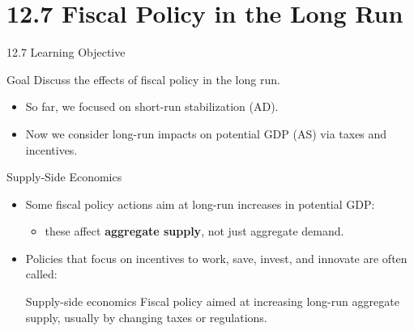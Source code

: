 \documentclass[aspectratio=169]{beamer}
\begin{document}
\section{12.7 Fiscal Policy in the Long Run}

\begin{frame}{12.7 Learning Objective}
\transfade
\begin{block}{Goal}
Discuss the effects of fiscal policy in the long run.
\end{block}
\begin{itemize}
  \item So far, we focused on short-run stabilization (AD).
  \item Now we consider long-run impacts on potential GDP (AS) via taxes and incentives.
\end{itemize}
\end{frame}

\begin{frame}{Supply-Side Economics}
\transfade
\begin{itemize}
  \item Some fiscal policy actions aim at long-run increases in potential GDP:
  \begin{itemize}
    \item these affect \textbf{aggregate supply}, not just aggregate demand.
  \end{itemize}
  \item Policies that focus on incentives to work, save, invest, and innovate are often called:
  \begin{block}{Supply-side economics}
    Fiscal policy aimed at increasing long-run aggregate supply, usually by changing taxes or regulations.
  \end{block}
\end{itemize}
\end{frame}
\end{document}
